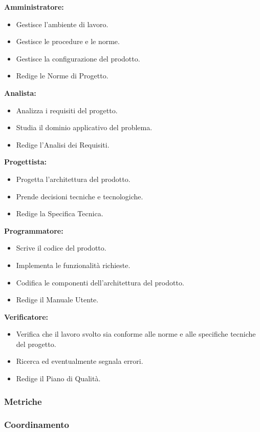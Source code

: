 \textbf{Amministratore:}
\begin{itemize}
    \item Gestisce l’ambiente di lavoro.
    \item Gestisce le procedure e le norme.
    \item Gestisce la configurazione del prodotto.
    \item Redige le Norme di Progetto.
\end{itemize}

\textbf{Analista:}
\begin{itemize}
    \item Analizza i requisiti del progetto.
    \item Studia il dominio applicativo del problema.
    \item Redige l’Analisi dei Requisiti.
\end{itemize}

\textbf{Progettista:}
\begin{itemize}
    \item Progetta l’architettura del prodotto.
    \item Prende decisioni tecniche e tecnologiche.
    \item Redige la Specifica Tecnica.
\end{itemize}

\textbf{Programmatore:}
\begin{itemize}
    \item Scrive il codice del prodotto.
    \item Implementa le funzionalità richieste.
    \item Codifica le componenti dell’architettura del prodotto.
    \item Redige il Manuale Utente.
\end{itemize}

\textbf{Verificatore:}
\begin{itemize}
    \item Verifica che il lavoro svolto sia conforme alle norme e alle specifiche tecniche del progetto.
    \item Ricerca ed eventualmente segnala errori.
    \item Redige il Piano di Qualità.
\end{itemize}


\subsubsection{Metriche}
\subsubsection{Coordinamento}
